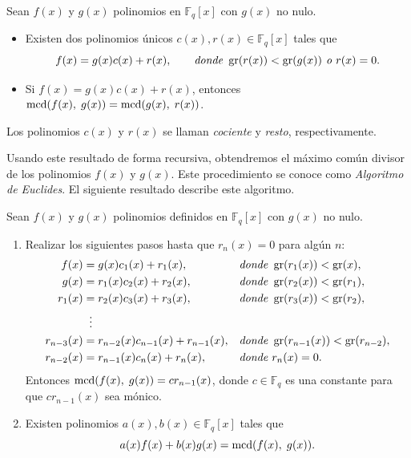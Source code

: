 \begin{theorem}
    \label{th:div_alg}
    Sean $f(x)$ y $g(x)$ polinomios en $\mathbb{F}_q[x]$ con $g(x)$ no nulo.
    \begin{itemize}
        \item Existen dos polinomios únicos $c(x), r(x) \in \mathbb{F}_q[x]$ tales que
        \[
            f(x) = g(x) c(x) + r(x), \qquad \textit{donde } \operatorname{gr}(r(x)) < \operatorname{gr}(g(x)) \textit{ o } r(x) = 0.
        \]
        \item Si $f(x) = g(x) c(x) + r(x)$, entonces $\operatorname{mcd}(f(x), \; g(x)) = \operatorname{mcd}(g(x), \; r(x))$.
    \end{itemize}
\end{theorem}

Los polinomios $c(x)$ y $r(x)$ se llaman \emph{cociente} y \emph{resto}, respectivamente.

Usando este resultado de forma recursiva, obtendremos el máximo común divisor de los polinomios $f(x)$ y $g(x)$. Este procedimiento se conoce como \emph{Algoritmo de Euclides}. El siguiente resultado describe este algoritmo.

\begin{theorem}
    \label{th:alg-euclides}
    Sean $f(x)$ y $g(x)$ polinomios definidos en $\mathbb{F}_q[x]$ con $g(x)$ no nulo.
    \begin{enumerate}
        \item Realizar los siguientes pasos hasta que $r_n(x) = 0$ para algún $n$:
            \begin{align*}
                f(x)        &= g(x) c_1(x) + r_1(x), & &\textit{donde } \operatorname{gr}(r_1(x)) < \operatorname{gr}(x),\\
                g(x)        &= r_1(x) c_2(x) + r_2(x),& &\textit{donde } \operatorname{gr}(r_2(x)) < \operatorname{gr}(r_1),\\
                r_1(x)      &= r_2(x) c_3(x) + r_3(x),& &\textit{donde } \operatorname{gr}(r_3(x)) < \operatorname{gr}(r_2),\\
                            &\; \; \vdots & &\\
                r_{n-3}(x)  &= r_{n-2}(x) c_{n-1}(x) + r_{n-1}(x),& &\textit{donde } \operatorname{gr}(r_{n-1}(x)) < \operatorname{gr}(r_{n-2}),\\
                r_{n-2}(x)  &= r_{n-1}(x) c_{n}(x) + r_{n}(x),& &\textit{donde } r_n(x) = 0.
            \end{align*}
            Entonces $\operatorname{mcd}(f(x), \; g(x)) = cr_{n-1}(x)$, donde $c \in \mathbb{F}_q$ es una constante para que $c r_{n-1}(x)$ sea mónico.
        \item Existen polinomios $a(x), b(x) \in \mathbb{F}_q[x]$ tales que 
        $$a(x) f(x) + b(x) g(x) = \operatorname{mcd}(f(x), \; g(x)).$$
    \end{enumerate}
\end{theorem}

